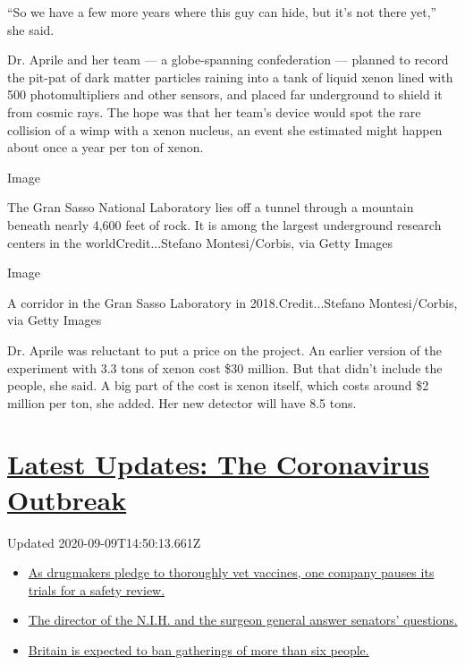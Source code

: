 ``So we have a few more years where this guy can hide, but it's not
there yet,'' she said.

Dr. Aprile and her team --- a globe-spanning confederation --- planned
to record the pit-pat of dark matter particles raining into a tank of
liquid xenon lined with 500 photomultipliers and other sensors, and
placed far underground to shield it from cosmic rays. The hope was that
her team's device would spot the rare collision of a wimp with a xenon
nucleus, an event she estimated might happen about once a year per ton
of xenon.

Image

The Gran Sasso National Laboratory lies off a tunnel through a mountain
beneath nearly 4,600 feet of rock. It is among the largest underground
research centers in the worldCredit...Stefano Montesi/Corbis, via Getty
Images

Image

A corridor in the Gran Sasso Laboratory in 2018.Credit...Stefano
Montesi/Corbis, via Getty Images

Dr. Aprile was reluctant to put a price on the project. An earlier
version of the experiment with 3.3 tons of xenon cost \$30 million. But
that didn't include the people, she said. A big part of the cost is
xenon itself, which costs around \$2 million per ton, she added. Her new
detector will have 8.5 tons.

\hypertarget{latest-updates-the-coronavirus-outbreak}{%
\section{\texorpdfstring{\href{https://www.nytimes3xbfgragh.onion/2020/09/09/world/covid-19-coronavirus.html?action=click\&pgtype=Article\&state=default\&region=MAIN_CONTENT_1\&context=storylines_live_updates}{Latest
Updates: The Coronavirus
Outbreak}}{Latest Updates: The Coronavirus Outbreak}}\label{latest-updates-the-coronavirus-outbreak}}

Updated 2020-09-09T14:50:13.661Z

\begin{itemize}
\tightlist
\item
  \href{https://www.nytimes3xbfgragh.onion/2020/09/09/world/covid-19-coronavirus.html?action=click\&pgtype=Article\&state=default\&region=MAIN_CONTENT_1\&context=storylines_live_updates\#link-5b0bf0d1}{As
  drugmakers pledge to thoroughly vet vaccines, one company pauses its
  trials for a safety review.}
\item
  \href{https://www.nytimes3xbfgragh.onion/2020/09/09/world/covid-19-coronavirus.html?action=click\&pgtype=Article\&state=default\&region=MAIN_CONTENT_1\&context=storylines_live_updates\#link-6e2052bd}{The
  director of the N.I.H. and the surgeon general answer senators'
  questions.}
\item
  \href{https://www.nytimes3xbfgragh.onion/2020/09/09/world/covid-19-coronavirus.html?action=click\&pgtype=Article\&state=default\&region=MAIN_CONTENT_1\&context=storylines_live_updates\#link-780eaa2f}{Britain
  is expected to ban gatherings of more than six people.}
\end{itemize}

